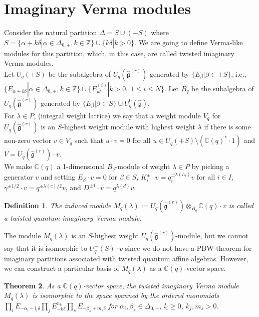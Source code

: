 \documentclass[12pt]{amsart}
\newtheorem{thm}{Theorem}[section]
\newtheorem{defi}[thm]{Definition}
\numberwithin{equation}{section}
\newcommand{\Z}{\ensuremath{\mathbb{Z}}}
\newcommand{\C}{\ensuremath{\mathbb{C}}}
\newcommand{\g}{\ensuremath{\mathfrak{g}}}
\begin{document}
\section{Imaginary Verma modules}

Consider the natural partition $\Delta = S \cup (-S)$ where  $S= \{ \alpha + k\delta | \alpha\in \Delta_{0,+}, k\in \Z   \} \cup \{ k\delta | k>0   \}$. We are going to define Verma-like modules for this partition, which, in this case, are called twisted imaginary Verma modules. \\

Let $U_q(\pm S)$ be the subalgebra of $U_q(\hat{\g}^{(r)})$ generated by $\{E_{\beta} | \beta \in \pm S\}$, i.e., $\{ E_{\alpha + k\delta} | \alpha\in \Delta_{0,+}, k\in \Z   \} \cup \{ E_{k\delta}^{(i)} | k>0, \ 1 \leq i \leq N   \}$. Let $B_q$ be the subalgebra of $U_q(\hat{\g}^{(r)})$ generated by $\{E_{\beta} | \beta \in S\} \cup U_q^0(\hat{\g})$.\\

For $\lambda\in P$, (integral weight lattice) we say that a weight module $V_q$ for $U_q(\hat{\g}^{(r)})$ is an $S$-highest weight module with highest weight $\lambda$ if there is some non-zero vector $v\in V_q$ such that $u\cdot v = 0$ for all $u \in U_q(+S) \setminus (\C(q)^{*}\cdot 1)$ and $V=U_q(\hat{\g}^{(r)})\cdot v$.\\

We make $\C(q)$ a 1-dimensional $B_q$-module of weight $\lambda \in P$ by picking a generator $v$ and setting $E_\beta \cdot v = 0$ for $\beta \in S$, $K_i^{\pm}\cdot v = q_i^{\pm \lambda(h_i)}v$ for all $i\in I$, $\gamma^{\pm 1/2}\cdot v = q^{\pm \lambda(c)/2}v$, and $D^{\pm 1}\cdot v = q^{\lambda(d)}v$.

\begin{defi}
    The induced module $M_q(\lambda) := U_q(\hat{\g}^{(r)}) \otimes_{B_q} \C(q)\cdot v$ is called a twisted quantum imaginary Verma module.
\end{defi}

The module $M_q(\lambda)$ is an $S$-highest weight $U_q(\hat{\g}^{(r)})$-module, but we cannot say that it is isomorphic to $U_q^{-}(S)\cdot v$ since we do not have a PBW theorem for imaginary partitions associated with twisted quantum affine algebras. However, we can construct a particular basis of $M_q(\lambda)$ as a $\C(q)$-vector space.

\begin{thm}\label{basisMq(l)}
    As a $\C(q)$-vector space, the twisted imaginary Verma module $M_q(\lambda)$ is isomorphic to the space spanned by the ordered monomials $\prod_i E_{-\alpha_i-l_i\delta} \prod_j E_{-k\delta}^{n_k} \prod_s E_{-\beta_s + m_s\delta}$ for $\alpha_i, \beta_s \in \Delta_{0,+}$, $l_i\geq 0$, $k_j, m_s>0$.
\end{thm}
\end{document}
